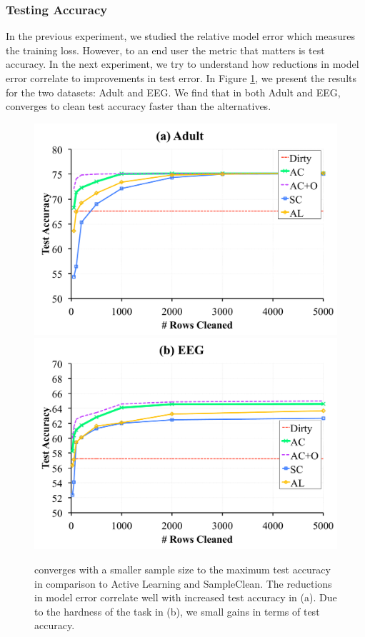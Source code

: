 \subsubsection{Testing Accuracy}
In the previous experiment, we studied the relative model error which measures the training loss. 
However, to an end user the metric that matters is test accuracy.
In the next experiment, we try to understand how reductions in model error correlate to improvements in test error.
In Figure \ref{prio-tperf}, we present the results for the two datasets: Adult and EEG.
We find that in both Adult and EEG, \sys converges to clean test accuracy faster than the alternatives.

\begin{figure}[ht!]
\centering
 \includegraphics[width=0.49\columnwidth]{exp/exp3bb.pdf}
  \includegraphics[width=0.49\columnwidth]{exp/exp3cc.pdf}
 \caption{\sys converges with a smaller sample size to the maximum test accuracy in comparison to Active Learning and SampleClean. The reductions in model error correlate well with increased test accuracy in (a). Due to the hardness of the task in (b), we small gains in terms of test accuracy. \label{prio-tperf}}
\end{figure}

